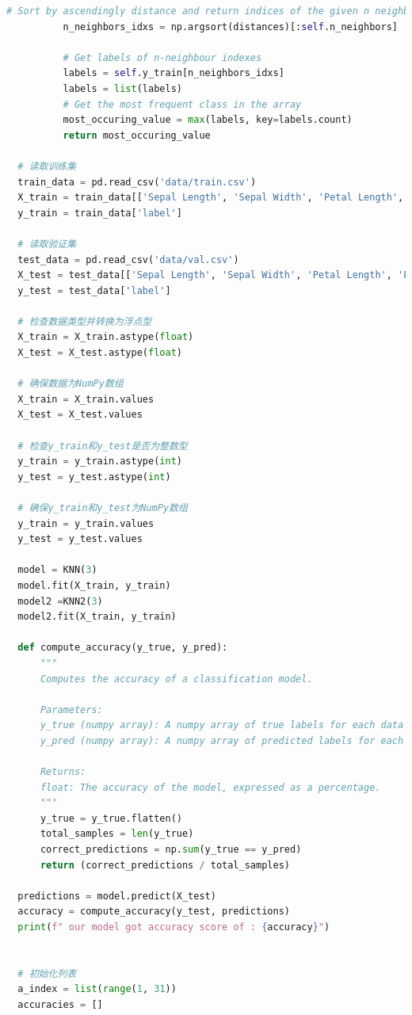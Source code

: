 \documentclass[12pt]{article}
\begin{document}
\begin{lstlisting}[language=Python]
          # Sort by ascendingly distance and return indices of the given n neighbours
          n_neighbors_idxs = np.argsort(distances)[:self.n_neighbors]
          
          # Get labels of n-neighbour indexes
          labels = self.y_train[n_neighbors_idxs]
          labels = list(labels)
          # Get the most frequent class in the array
          most_occuring_value = max(labels, key=labels.count)
          return most_occuring_value
  
  # 读取训练集
  train_data = pd.read_csv('data/train.csv')
  X_train = train_data[['Sepal Length', 'Sepal Width', 'Petal Length', 'Petal Width']]
  y_train = train_data['label']
  
  # 读取验证集
  test_data = pd.read_csv('data/val.csv')
  X_test = test_data[['Sepal Length', 'Sepal Width', 'Petal Length', 'Petal Width']]
  y_test = test_data['label']
  
  # 检查数据类型并转换为浮点型
  X_train = X_train.astype(float)
  X_test = X_test.astype(float)
  
  # 确保数据为NumPy数组
  X_train = X_train.values
  X_test = X_test.values
  
  # 检查y_train和y_test是否为整数型
  y_train = y_train.astype(int)
  y_test = y_test.astype(int)
  
  # 确保y_train和y_test为NumPy数组
  y_train = y_train.values
  y_test = y_test.values
  
  model = KNN(3)
  model.fit(X_train, y_train)
  model2 =KNN2(3)
  model2.fit(X_train, y_train)
  
  def compute_accuracy(y_true, y_pred):
      """
      Computes the accuracy of a classification model.
  
      Parameters:
      y_true (numpy array): A numpy array of true labels for each data point.
      y_pred (numpy array): A numpy array of predicted labels for each data point.
  
      Returns:
      float: The accuracy of the model, expressed as a percentage.
      """
      y_true = y_true.flatten()
      total_samples = len(y_true)
      correct_predictions = np.sum(y_true == y_pred)
      return (correct_predictions / total_samples) 
  
  predictions = model.predict(X_test)
  accuracy = compute_accuracy(y_test, predictions)
  print(f" our model got accuracy score of : {accuracy}")   
  
  
  # 初始化列表
  a_index = list(range(1, 31))
  accuracies = []
  

\end{lstlisting}
\end{document}
